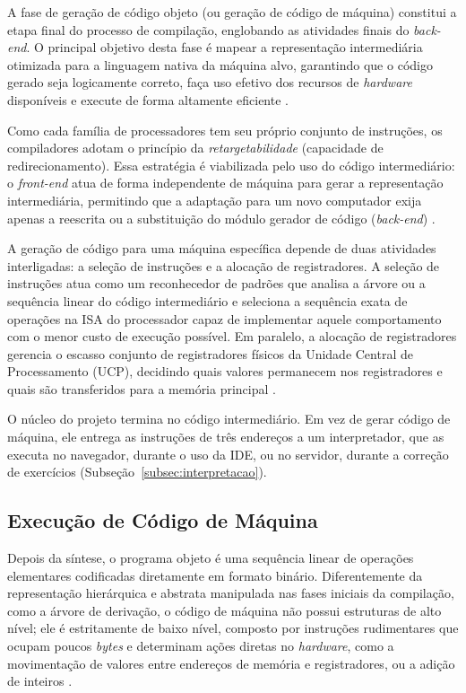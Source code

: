 A fase de geração de código objeto (ou geração de código de máquina) constitui a etapa final do processo de compilação, englobando as atividades finais do \textit{back-end}. O principal objetivo desta fase é mapear a representação intermediária otimizada para a linguagem nativa da máquina alvo, garantindo que o código gerado seja logicamente correto, faça uso efetivo dos recursos de \textit{hardware} disponíveis e execute de forma altamente eficiente \cite{aho1995}.

Como cada família de processadores tem seu próprio conjunto de instruções, os compiladores adotam o princípio da \textit{retargetabilidade} (capacidade de redirecionamento). Essa estratégia é viabilizada pelo uso do código intermediário: o \textit{front-end} atua de forma independente de máquina para gerar a representação intermediária, permitindo que a adaptação para um novo computador exija apenas a reescrita ou a substituição do módulo gerador de código (\textit{back-end}) \cite{aho1995,cooper2012}.

A geração de código para uma máquina específica depende de duas atividades interligadas: a seleção de instruções e a alocação de registradores. A seleção de instruções atua como um reconhecedor de padrões que analisa a árvore ou a sequência linear do código intermediário e seleciona a sequência exata de operações na ISA do processador capaz de implementar aquele comportamento com o menor custo de execução possível. Em paralelo, a alocação de registradores gerencia o escasso conjunto de registradores físicos da Unidade Central de Processamento (UCP), decidindo quais valores permanecem nos registradores e quais são transferidos para a memória principal \cite{price2001,appel2002}.

O núcleo do projeto termina no código intermediário. Em vez de gerar código de máquina, ele entrega as instruções de três endereços a um interpretador, que as executa no navegador, durante o uso da IDE, ou no servidor, durante a correção de exercícios (Subseção~\ref{subsec:interpretacao}).

\subsection{Execução de Código de Máquina}

Depois da síntese, o programa objeto é uma sequência linear de operações elementares codificadas diretamente em formato binário.
Diferentemente da representação hierárquica e abstrata manipulada nas fases iniciais da compilação, como a árvore de derivação, o código de máquina não possui estruturas de alto nível; ele é estritamente de baixo nível, composto por instruções rudimentares que ocupam poucos \textit{bytes} e determinam ações diretas no \textit{hardware}, como a movimentação de valores entre endereços de memória e registradores, ou a adição de inteiros \cite{price2001}.

